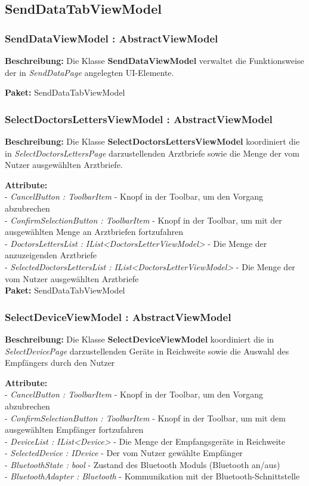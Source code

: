 \documentclass[a4paper]{scrreprt}
\begin{document}
\subsection{SendDataTabViewModel}
\subsubsection{SendDataViewModel : AbstractViewModel}
\textbf{Beschreibung:} Die Klasse \textbf{SendDataViewModel} verwaltet die Funktionsweise der in \textit{SendDataPage} angelegten UI-Elemente.

\textbf{Paket:} SendDataTabViewModel

\subsubsection{SelectDoctorsLettersViewModel : AbstractViewModel}
\textbf{Beschreibung:} Die Klasse \textbf{SelectDoctorsLettersViewModel} koordiniert die in \textit{SelectDoctorsLettersPage} darzustellenden Arztbriefe sowie die Menge der vom Nutzer ausgewählten Arztbriefe.

\textbf{Attribute:}\\
- \textit{CancelButton : ToolbarItem} - Knopf in der Toolbar, um den Vorgang abzubrechen\\
- \textit{ConfirmSelectionButton : ToolbarItem} - Knopf in der Toolbar, um mit der ausgewählten Menge an Arztbriefen fortzufahren\\
- \textit{DoctorsLettersList : IList<DoctorsLetterViewModel>} - Die Menge der anzuzeigenden Arztbriefe\\
- \textit{SelectedDoctorsLettersList : IList<DoctorsLetterViewModel>} - Die Menge der vom Nutzer ausgewählten Arztbriefe\\

\textbf{Paket:} SendDataTabViewModel

\subsubsection{SelectDeviceViewModel : AbstractViewModel}
\textbf{Beschreibung:} Die Klasse \textbf{SelectDeviceViewModel} koordiniert die in \textit{SelectDevicePage} darzustellenden Geräte in Reichweite sowie die Auswahl des Empfängers durch den Nutzer

\textbf{Attribute:}\\
- \textit{CancelButton : ToolbarItem} - Knopf in der Toolbar, um den Vorgang abzubrechen\\
- \textit{ConfirmSelectionButton : ToolbarItem} - Knopf in der Toolbar, um mit dem ausgewählten Empfänger fortzufahren\\
- \textit{DeviceList : IList<Device>} - Die Menge der Empfangsgeräte in Reichweite\\
- \textit{SelectedDevice : IDevice} - Der vom Nutzer gewählte Empfänger\\
- \textit{BluetoothState : bool} - Zustand des Bluetooth Moduls (Bluetooth an/aus)\\
- \textit{BluetoothAdapter : Bluetooth} - Kommunikation mit der Bluetooth-Schnittstelle\\
\end{document}
